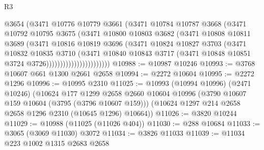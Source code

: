 \begin{lexlean}{R3}
\begin{coremodule}
                              @3654
                              (@3471
                                @10776
                                @10779
                                @3661
                                (@3471
                                  @10784
                                  @10787
                                  @3668
                                  (@3471
                                    @10792
                                    @10795
                                    @3675
                                    (@3471
                                      @10800
                                      @10803
                                      @3682
                                      (@3471
                                        @10808
                                        @10811
                                        @3689
                                        (@3471
                                          @10816
                                          @10819
                                          @3696
                                          (@3471
                                            @10824
                                            @10827
                                            @3703
                                            (@3471
                                              @10832
                                              @10835
                                              @3710
                                              (@3471
                                                @10840
                                                @10843
                                                @3717
                                                (@3471
                                                  @10848
                                                  @10851
                                                  @3724
                                                  @3726)))))))))))))))))))))))
@10988 := @10987 @10246
@10993 := @3768 @10607 @661 @1300 @2661 @2658
@10994 := @2272 @10604
@10995 := @2272 @1296
@10996 := @10995 @2310
@11025 := @10993
    (@10994 @10996)
    (@2471 @10246)
    (@10624
      @177
      @1299
      @2658
      @2660
      @10604
      @10996
      (@3790 @10607 @159 @10604 (@3795 (@3796 @10607 @159)))
      (@10624 @1297 @214 @2658 @2658 @1296 @2310 (@10645 @1296) @10664))
@11026 := @3820 @10244
@11029 := @10988 (@11025 (@11026 @404))
@11030 := @288 @10684
@11033 := @3065 (@3069 @11030) @3072
@11034 := @3826 @11033
@11039 := @11034 @223 @1002 @1315 @2683 @2658

\end{coremodule}
\end{lexlean}
